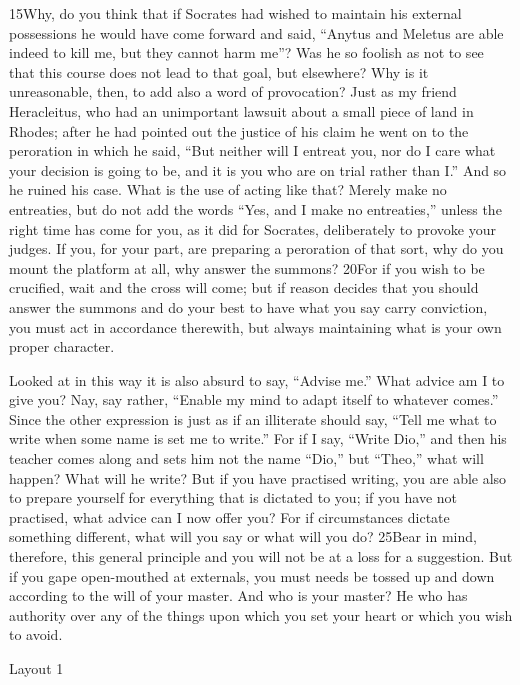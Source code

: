 15Why, do you think that if Socrates had wished to maintain his external possessions he would have come forward and said, ``Anytus and Meletus are able indeed to kill me, but they cannot harm me''? Was he so foolish as not to see that this course does not lead to that goal, but elsewhere? Why is it unreasonable, then, to add also a word of provocation? Just as my friend Heracleitus, who had an unimportant lawsuit about a small piece of land in Rhodes; after he had pointed out the justice of his claim he went on to the peroration in which he said, ``But neither will I entreat you, nor do I care what your decision is going to be, and it is you who are on trial rather than I.'' And so he ruined his case. What is the use of acting like that? Merely make no entreaties, but do not add the words ``Yes, and I make no entreaties,'' unless the right time has come for you, as it did for Socrates, deliberately to provoke your judges. If you, for your part, are preparing a peroration of that sort, why do you mount the platform at all, why answer the summons? 20For if you wish to be crucified, wait and the cross will come; but if reason decides that you should answer the summons and do your best to have what you say carry conviction, you must act in accordance therewith, but always maintaining what is your own proper character.

Looked at in this way it is also absurd to say, ``Advise me.'' What advice am I to give you? Nay, say rather, ``Enable my mind to adapt itself to whatever comes.'' Since the other expression is just as if an illiterate should say, ``Tell me what to write when some name is set me to write.'' For if I say, ``Write Dio,'' and then his teacher comes along and sets him not the name ``Dio,'' but ``Theo,'' what will happen? What will he write? But if you have practised writing, you are able also to prepare yourself for everything that is dictated to you; if you have not practised, what advice can I now offer you? For if circumstances dictate something different, what will you say or what will you do? 25Bear in mind, therefore, this general principle and you will not be at a loss for a suggestion. But if you gape open-mouthed at externals, you must needs be tossed up and down according to the will of your master. And who is your master? He who has authority over any of the things upon which you set your heart or which you wish to avoid.



Layout 1

